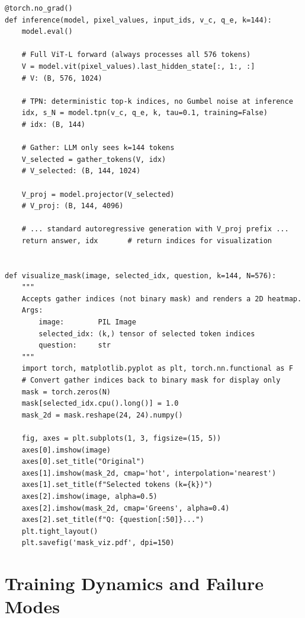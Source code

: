 \documentclass[11pt,a4paper]{article}
\begin{document}
\begin{lstlisting}[caption={Inference with gather (deterministic top-k, no Gumbel noise).}]
@torch.no_grad()
def inference(model, pixel_values, input_ids, v_c, q_e, k=144):
    model.eval()

    # Full ViT-L forward (always processes all 576 tokens)
    V = model.vit(pixel_values).last_hidden_state[:, 1:, :]
    # V: (B, 576, 1024)

    # TPN: deterministic top-k indices, no Gumbel noise at inference
    idx, s_N = model.tpn(v_c, q_e, k, tau=0.1, training=False)
    # idx: (B, 144)

    # Gather: LLM only sees k=144 tokens
    V_selected = gather_tokens(V, idx)
    # V_selected: (B, 144, 1024)

    V_proj = model.projector(V_selected)
    # V_proj: (B, 144, 4096)

    # ... standard autoregressive generation with V_proj prefix ...
    return answer, idx       # return indices for visualization


def visualize_mask(image, selected_idx, question, k=144, N=576):
    """
    Accepts gather indices (not binary mask) and renders a 2D heatmap.
    Args:
        image:        PIL Image
        selected_idx: (k,) tensor of selected token indices
        question:     str
    """
    import torch, matplotlib.pyplot as plt, torch.nn.functional as F
    # Convert gather indices back to binary mask for display only
    mask = torch.zeros(N)
    mask[selected_idx.cpu().long()] = 1.0
    mask_2d = mask.reshape(24, 24).numpy()

    fig, axes = plt.subplots(1, 3, figsize=(15, 5))
    axes[0].imshow(image)
    axes[0].set_title("Original")
    axes[1].imshow(mask_2d, cmap='hot', interpolation='nearest')
    axes[1].set_title(f"Selected tokens (k={k})")
    axes[2].imshow(image, alpha=0.5)
    axes[2].imshow(mask_2d, cmap='Greens', alpha=0.4)
    axes[2].set_title(f"Q: {question[:50]}...")
    plt.tight_layout()
    plt.savefig('mask_viz.pdf', dpi=150)
\end{lstlisting}

\section{Training Dynamics and Failure Modes}
\label{sec:failures}
\end{document}
